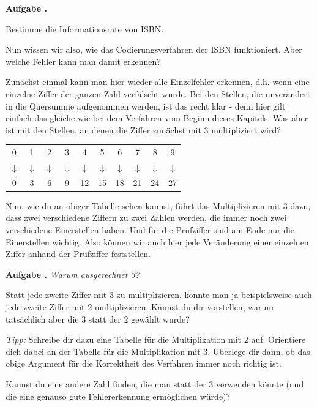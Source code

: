 \documentclass[a4paper,ngerman,12pt]{scrartcl}
\theoremstyle{definition}
\theoremstyle{plain}
\theoremstyle{remark}
\newlength{\aufgabenskip}
\newcounter{aufgabennummer}
\newenvironment{aufgabe}[1]{
	\addtocounter{aufgabennummer}{1}
	\textbf{Aufgabe \theaufgabennummer.} \emph{#1} \par
}{\vspace{\aufgabenskip}}
\begin{document}
\begin{aufgabe}{}
	Bestimme die Informationsrate von ISBN.
\end{aufgabe}

Nun wissen wir also, wie das Codierungsverfahren der ISBN funktioniert. Aber welche Fehler kann man damit erkennen? 

Zunächst einmal kann man hier wieder alle Einzelfehler erkennen, d.h. wenn eine einzelne Ziffer der ganzen Zahl verfälscht wurde. Bei den Stellen, die unverändert in die Quersumme aufgenommen werden, ist das recht klar - denn hier gilt einfach das gleiche wie bei dem Verfahren vom Beginn dieses Kapitels. Was aber ist mit den Stellen, an denen die Ziffer zunächst mit $3$ multipliziert wird?

\begin{center}
	\begin{tabular}{cccccccccc}
		0 & 1 & 2 & 3 & 4 & 5 & 6 & 7 & 8 & 9 \\
		$\downarrow$ & $\downarrow$ & $\downarrow$ & $\downarrow$ & $\downarrow$ & $\downarrow$ & $\downarrow$ & $\downarrow$ & $\downarrow$ & $\downarrow$ \\
		0 & 3 & 6 & 9 & 12 & 15 & 18 & 21 & 24 & 27
	\end{tabular}
\end{center}

Nun, wie du an obiger Tabelle sehen kannst, führt das Multiplizieren mit $3$ dazu, dass zwei verschiedene Ziffern zu zwei Zahlen werden, die immer noch zwei verschiedene Einerstellen haben. Und für die Prüfziffer sind am Ende nur die Einerstellen wichtig. Also können wir auch hier jede Veränderung einer einzelnen Ziffer anhand der Prüfziffer feststellen.

\begin{aufgabe}{Warum ausgerechnet 3?}
	Statt jede zweite Ziffer mit $3$ zu multiplizieren, könnte man ja beispielsweise auch jede zweite Ziffer mit $2$ multiplizieren. Kannst du dir vorstellen, warum tatsächlich aber die $3$ statt der $2$ gewählt wurde? 
	
	\emph{Tipp:} Schreibe dir dazu eine Tabelle für die Multiplikation mit $2$ auf. Orientiere dich dabei an der Tabelle für die Multiplikation mit $3$. Überlege dir dann, ob das obige Argument für die Korrektheit des Verfahren immer noch richtig ist.
	
	Kannst du eine andere Zahl finden, die man statt der $3$ verwenden könnte (und die eine genauso gute Fehlererkennung ermöglichen würde)?
\end{aufgabe}
\end{document}

